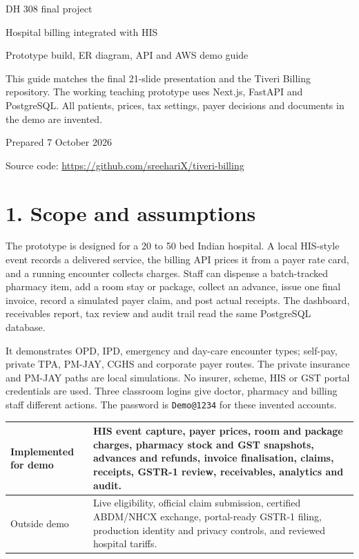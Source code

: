 \documentclass[11pt,a4paper]{article}
\newcommand{\sect}[1]{\section*{\color{navy}#1}\addcontentsline{toc}{section}{#1}}
\begin{document}
\vspace*{24mm}
{\color{teal}\Large DH 308 final project}\par
\vspace{7mm}
{\color{navy}\Huge Hospital billing integrated with HIS}\par
\vspace{7mm}
{\Large Prototype build, ER diagram, API and AWS demo guide}\par
\vspace{12mm}
\colorbox{pale}{\parbox{0.91\textwidth}{This guide matches the final 21-slide presentation and the Tiveri Billing repository. The working teaching prototype uses Next.js, FastAPI and PostgreSQL. All patients, prices, tax settings, payer decisions and documents in the demo are invented.}}
\vfill
Prepared 7 October 2026\par
Source code: \url{https://github.com/sreehariX/tiveri-billing}\par
\newpage
\tableofcontents
\newpage

\sect{1. Scope and assumptions}
The prototype is designed for a 20 to 50 bed Indian hospital. A local HIS-style event records a delivered service, the billing API prices it from a payer rate card, and a running encounter collects charges. Staff can dispense a batch-tracked pharmacy item, add a room stay or package, collect an advance, issue one final invoice, record a simulated payer claim, and post actual receipts. The dashboard, receivables report, tax review and audit trail read the same PostgreSQL database.

It demonstrates OPD, IPD, emergency and day-care encounter types; self-pay, private TPA, PM-JAY, CGHS and corporate payer routes. The private insurance and PM-JAY paths are local simulations. No insurer, scheme, HIS or GST portal credentials are used. Three classroom logins give doctor, pharmacy and billing staff different actions. The password is \texttt{Demo@1234} for these invented accounts.

\begin{tabular}{p{}p{}}
\toprule
Implemented for demo & HIS event capture, payer prices, room and package charges, pharmacy stock and GST snapshots, advances and refunds, invoice finalisation, claims, receipts, GSTR-1 review, receivables, analytics and audit.\\
\midrule
Outside demo & Live eligibility, official claim submission, certified ABDM/NHCX exchange, portal-ready GSTR-1 filing, production identity and privacy controls, and reviewed hospital tariffs.\\
\bottomrule
\end{tabular}
\end{document}
